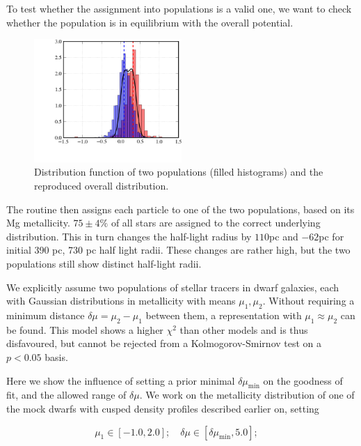 To test whether the assignment into populations is a valid one, we
want to check whether the population is in equilibrium with the
overall potential.

\begin{figure}
\begin{center}
\hspace{-7mm}
\includegraphics[width=0.5\textwidth]{fig/pymcmetals.png}
\caption{Distribution function of two populations (filled histograms) and the reproduced overall distribution.}
\label{fig:pops}
\end{center}
\end{figure}

The routine then assigns each particle to one of the two populations,
based on its Mg metallicity. $75\pm4\%$ of all stars are assigned to
the correct underlying distribution. This in turn changes the
half-light radius by $110$pc and $-62$pc for initial 390 pc, 730 pc
half light radii. These changes are rather high, but the two
populations still show distinct half-light radii.


We explicitly assume two populations of stellar tracers in dwarf
galaxies, each with Gaussian distributions in metallicity with means
$\mu_1,\mu_2$. Without requiring a minimum distance $\delta
\mu=\mu_2-\mu_1$ between them, a representation with $\mu_1 \approx
\mu_2$ can be found. This model shows a higher $\chi^2$ than other
models and is thus disfavoured, but cannot be rejected from a
Kolmogorov-Smirnov test on a $p<0.05$ basis.

Here we show the influence of setting a prior minimal
$\delta\mu_{\min}$ on the goodness of fit, and the allowed range of
$\delta \mu$. We work on the metallicity distribution of one of the
mock dwarfs with cusped density profiles described earlier on, setting

\begin{equation}
\mu_1\in[-1.0,2.0];\quad \delta \mu \in [ \delta\mu_{\min}, 5.0];\quad 
\end{equation}

